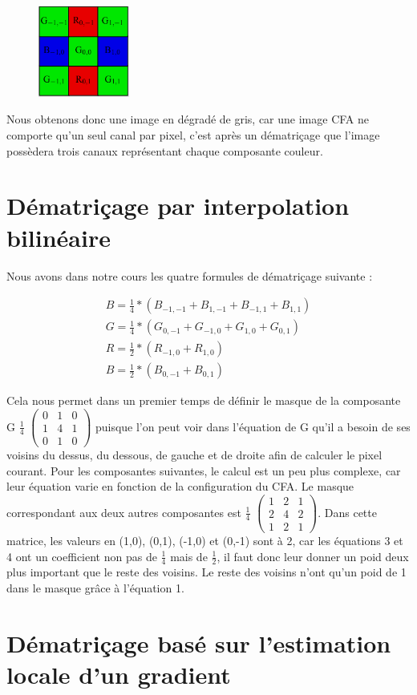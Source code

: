 \documentclass[a4paper,11pt]{article}
\begin{document}
  \begin{figure}[H]
  \center
   \includegraphics[width=3cm]{bayerBGB.png}
  \end{figure}
  
  Nous obtenons donc une image en dégradé de gris, car une image CFA ne comporte qu'un seul canal par pixel,
  c'est après un dématriçage que l'image possèdera trois canaux représentant chaque composante couleur.
  
  \section{Dématriçage par interpolation bilinéaire}
  Nous avons dans notre cours les quatre formules de dématriçage suivante :
  
  \begin{align}
  B = \frac{1}{4} * (B_{-1,-1}+B_{1,-1}+B_{-1,1}+B_{1,1})\\
  G = \frac{1}{4} * (G_{0,-1}+G_{-1,0}+G_{1,0}+G_{0,1})\\
  R = \frac{1}{2} * (R_{-1,0}+R_{1,0})\\
  B = \frac{1}{2} * (B_{0,-1}+B_{0,1})
  \end{align}
  
  Cela nous permet dans un premier temps de définir le masque de la composante G $\frac{1}{4}$
  $\begin{pmatrix}
   0 & 1 & 0\\
   1 & 4 & 1\\
   0 & 1 & 0
  \end{pmatrix}$
  puisque l'on peut voir dans l'équation de G qu'il a besoin de ses voisins du dessus, du dessous,
  de gauche et de droite afin de calculer le pixel courant. Pour les composantes suivantes, le calcul
  est un peu plus complexe, car leur équation varie en fonction de la configuration du CFA. Le masque
  correspondant aux deux autres composantes est $\frac{1}{4}$
  $\begin{pmatrix}
   1 & 2 & 1\\
   2 & 4 & 2\\
   1 & 2 & 1
  \end{pmatrix}$. Dans cette matrice, les valeurs en (1,0), (0,1), (-1,0) et (0,-1) sont à 2, car 
  les équations 3 et 4 ont un coefficient non pas de $\frac{1}{4}$ mais de $\frac{1}{2}$, il faut
  donc leur donner un poid deux plus important que le reste des voisins. Le reste des voisins n'ont 
  qu'un poid de 1 dans le masque grâce à l'équation 1.
  
  
  \section{Dématriçage basé sur l'estimation locale d'un gradient}
  
 
\end{document}
